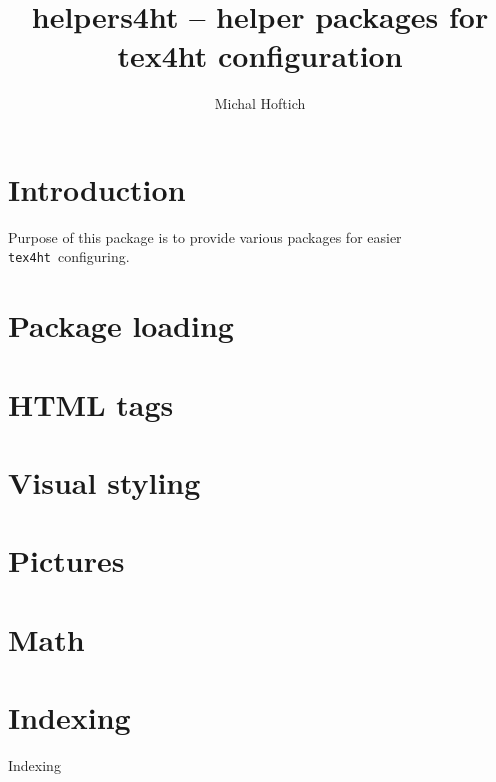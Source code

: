 \documentclass{article}
\begin{document}
 
\title{helpers4ht -- helper packages for tex4ht configuration}
\author{Michal Hoftich}
\def\texforht{\texttt{tex4ht}}
\maketitle

\tableofcontents
\section{Introduction}

Purpose of this package is to provide various packages for easier 
\texforht\ configuring. 

\section{Package loading}
\section{HTML tags}
\section{Visual styling}
\section{Pictures}
\section{Math}
\section{Indexing}

Indexing
\end{document}
